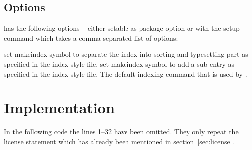 \documentclass{cnpkgdoc}
\begin{document}
\subsection{Options}
\idxcmds has the following options -- either setable as package option or with
the setup command  which takes a comma separated
list of options:
\begin{beschreibung}
    set makeindex symbol to separate the index into sorting and typesetting
    part as specified in the index style file.
  \Default{!}
    set makeindex symbol to add a sub entry as specified in the index style
    file.
    The default indexing command that is used by \idxcmds.
\end{beschreibung}

\printbibliography

\section{Implementation}
In the following code the lines 1--32 have been omitted.  They only repeat the
license statement which has already been mentioned in
section~\ref{sec:license}.

\implementation[linerange={33-1000},firstnumber=33]

{}
\printindex
\clearpage
\printindex[examples]
\end{document}
